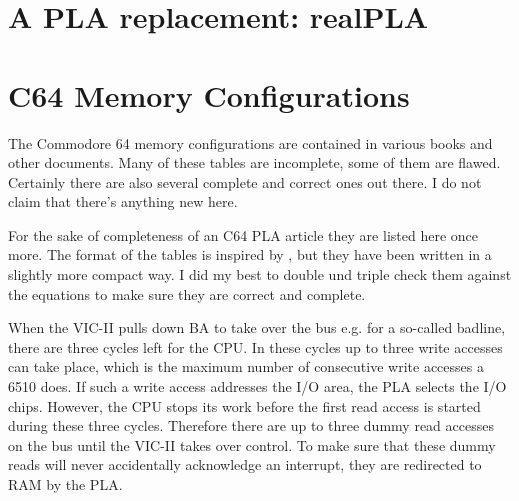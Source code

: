 \documentclass[a4paper,oneside]{memoir}
\begin{document}
\chapter{A PLA replacement: realPLA}


\appendix
\chapter{C64 Memory Configurations}

The Commodore 64 memory configurations are contained in various books and
other documents. Many of these tables are incomplete, some of them are
flawed. Certainly there are also several complete and correct ones out there.
I do not claim that there's anything new here.

For the sake of completeness of an C64 PLA article they are listed here once
more. The format of the tables is inspired by \cite{Lev86}, but they have
been written in a slightly more compact way. I did my best to double und triple
check them against the equations to make sure they are correct and complete.

When the VIC-II pulls down BA to take over the bus e.g. for a so-called
badline, there are three cycles left for the CPU. In these cycles up to
three write accesses can take place, which is the maximum number of
consecutive write accesses a 6510 does. If such a write access addresses the
I/O area, the PLA selects the I/O chips. However, the CPU stops its work
before the first read access is started during these three cycles. Therefore
there are up to three dummy read accesses on the bus until the VIC-II takes
over control. To make sure that these dummy reads will never accidentally
acknowledge an interrupt, they are redirected to RAM by the PLA.
\end{document}

